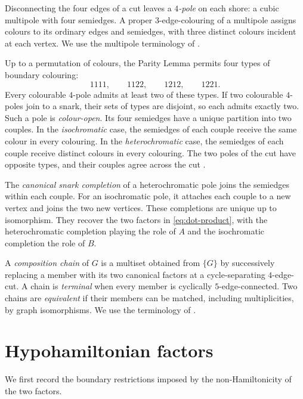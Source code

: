 \documentclass[justified,notoc,twoside,nobib,nofonts]{tufte-handout}
\begin{document}
Disconnecting the four edges of a cut leaves a \emph{$4$-pole} on each
shore: a cubic multipole with four semiedges. A proper $3$-edge-colouring
of a multipole assigns colours to its ordinary edges and semiedges,
with three distinct colours incident at each vertex. We use the
multipole terminology of \citep[Section~3]{CS10}.

Up to a permutation of colours, the Parity Lemma permits four types
of boundary colouring:
\[
 1111,\qquad1122,\qquad1212,\qquad1221.
\]
Every colourable $4$-pole admits at least two of these types. If two
colourable $4$-poles join to a snark, their sets of types are disjoint,
so each admits exactly two. Such a pole is \emph{colour-open}.
Its four semiedges have a unique partition into two couples. In the
\emph{isochromatic} case, the semiedges of each couple receive the same
colour in every colouring. In the \emph{heterochromatic} case, the
semiedges of each couple receive distinct colours in every colouring.
The two poles of the cut have opposite types, and their couples agree
across the cut \citep[Propositions~3.1--3.5]{CS10}.

The \emph{canonical snark completion} of a heterochromatic pole joins
the semiedges within each couple. For an isochromatic pole, it attaches
each couple to a new vertex and joins the two new vertices. These
completions are unique up to isomorphism. They recover the two factors
in \eqref{eq:dot-product}, with the heterochromatic completion playing
the role of $A$ and the isochromatic completion the role of $B$.

A \emph{composition chain} of $G$ is a multiset obtained from $\{G\}$
by successively replacing a member with its two canonical factors
at a cycle-separating $4$-edge-cut. A chain is \emph{terminal} when every
member is cyclically $5$-edge-connected. Two chains are
\emph{equivalent} if their members can be matched, including
multiplicities, by graph isomorphisms. We use the terminology of
\citep[Section~7]{CS10}.

\section{Hypohamiltonian factors}\label{sec:hypohamiltonian}

We first record the boundary restrictions imposed by the
non-Hamiltonicity of the two factors.
\end{document}

